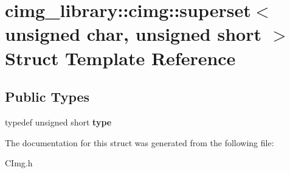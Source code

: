 \hypertarget{structcimg__library_1_1cimg_1_1superset_3_01unsigned_01char_00_01unsigned_01short_01_4}{\section{cimg\-\_\-library\-:\-:cimg\-:\-:superset$<$ unsigned char, unsigned short $>$ Struct Template Reference}
\label{structcimg__library_1_1cimg_1_1superset_3_01unsigned_01char_00_01unsigned_01short_01_4}
}
\subsection*{Public Types}
\begin{DoxyCompactItemize}
\item 
\hypertarget{structcimg__library_1_1cimg_1_1superset_3_01unsigned_01char_00_01unsigned_01short_01_4_a00e4254bd5138a197bd707665864a4ec}{typedef unsigned short {\bfseries type}}\label{structcimg__library_1_1cimg_1_1superset_3_01unsigned_01char_00_01unsigned_01short_01_4_a00e4254bd5138a197bd707665864a4ec}

\end{DoxyCompactItemize}


The documentation for this struct was generated from the following file\-:\begin{DoxyCompactItemize}
\item 
C\-Img.\-h\end{DoxyCompactItemize}
